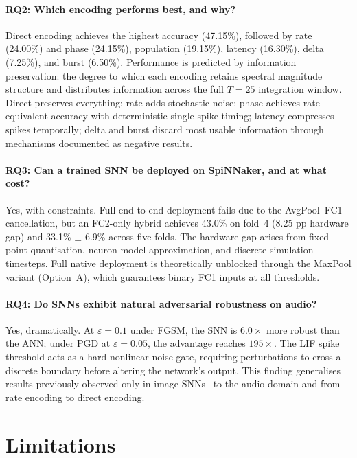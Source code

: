 \paragraph{RQ2: Which encoding performs best, and why?}
Direct encoding achieves the highest accuracy (47.15\%), followed by rate (24.00\%) and phase (24.15\%), population (19.15\%), latency (16.30\%), delta (7.25\%), and burst (6.50\%). Performance is predicted by information preservation: the degree to which each encoding retains spectral magnitude structure and distributes information across the full $T = 25$ integration window. Direct preserves everything; rate adds stochastic noise; phase achieves rate-equivalent accuracy with deterministic single-spike timing; latency compresses spikes temporally; delta and burst discard most usable information through mechanisms documented as negative results.

\paragraph{RQ3: Can a trained SNN be deployed on SpiNNaker, and at what cost?}
Yes, with constraints. Full end-to-end deployment fails due to the AvgPool--FC1 cancellation, but an FC2-only hybrid achieves 43.0\% on fold~4 (8.25 pp hardware gap) and 33.1\% $\pm$ 6.9\% across five folds. The hardware gap arises from fixed-point quantisation, neuron model approximation, and discrete simulation timesteps. Full native deployment is theoretically unblocked through the MaxPool variant (Option~A), which guarantees binary FC1 inputs at all thresholds.

\paragraph{RQ4: Do SNNs exhibit natural adversarial robustness on audio?}
Yes, dramatically. At $\varepsilon = 0.1$ under FGSM, the SNN is $6.0\times$ more robust than the ANN; under PGD at $\varepsilon = 0.05$, the advantage reaches $195\times$. The LIF spike threshold acts as a hard nonlinear noise gate, requiring perturbations to cross a discrete boundary before altering the network's output. This finding generalises results previously observed only in image SNNs~\citep{sharmin2020} to the audio domain and from rate encoding to direct encoding.

\section{Limitations}
\label{sec:limitations}

